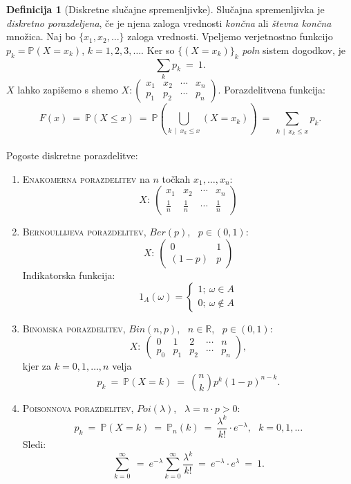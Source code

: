 \documentclass[11pt]{article}
\theoremstyle{definition}
\newtheorem{definicija}{Definicija}[section]
\theoremstyle{definition}
\theoremstyle{definition}
\begin{document}
\begin{definicija}[Diskretne slučajne spremenljivke]

Slučajna spremenljivka je \textit{diskretno porazdeljena}, če je njena zaloga vrednosti \textit{končna} ali \textit{števna končna} množica. Naj bo $\{ x_1, x_2, \ldots \}$ zaloga vrednosti. Vpeljemo verjetnostno funkcijo $p_k = \mathbb{P}(X = x_k)$, $k = 1, 2, 3, \ldots.$ Ker so $\{ (X = x_k) \}_k$ \textit{poln} sistem dogodkov, je 
$$\sum_k p_k ~=~ 1.$$
$X$ lahko zapišemo s shemo 
$X: \begin{pmatrix}
	x_1 & x_2 & \cdots & x_n \\
	p_1 & p_2 & \cdots & p_n
\end{pmatrix}$. Porazdelitvena funkcija:
$$F(x) ~=~ \mathbb{P}(X \leq x) ~=~ \mathbb{P}\left( \bigcup_{k ~\mid~ x_k \leq x} (X = x_k) \right) ~=~ \sum_{k ~\mid~ x_k \leq x} p_k.$$ \\

\noindent Pogoste diskretne porazdelitve:
\begin{enumerate}
	\item \textsc{Enakomerna porazdelitev} na $n$ točkah $x_1, \ldots, x_n$:
	$$X: ~\begin{pmatrix}
		x_1 & x_2 & \cdots & x_n \\
		\frac{1}{n} & \frac{1}{n} & \cdots & \frac{1}{n}
	\end{pmatrix}$$
	
	\item \textsc{Bernoullijeva porazdelitev}, $Ber(p)$, ~$p \in (0, 1)$:
	$$X: ~\begin{pmatrix}
		0 & 1 \\
		(1-p) & p
	\end{pmatrix}$$
	Indikatorska funkcija:
	$$1_A(\omega) = \begin{cases}
	1 ; ~\omega \in A \\
	0 ; ~\omega \notin A
	\end{cases}$$
	
	\item \textsc{Binomska porazdelitev}, $Bin(n, p)$, ~$n \in \mathbb{R}$, ~$p \in (0, 1)$:
	$$X: ~\begin{pmatrix}
		0 & 1 & 2 & \cdots & n \\
		p_0 & p_1 & p_2 & \cdots & p_n
	\end{pmatrix},$$
	kjer za $k = 0, 1, \ldots, n$ velja
	$$p_k ~=~ \mathbb{P}(X = k) ~=~ \binom{n}{k} p^k (1 - p)^{n-k}.$$
	
	\item \textsc{Poisonnova porazdelitev}, $Poi(\lambda)$, ~$\lambda = n \cdot p > 0$:
	$$p_k ~=~ \mathbb{P}(X = k) ~=~ \mathbb{P}_n(k) ~=~ \frac{\lambda^k}{k!} \cdot e^{-\lambda}, ~~~k = 0, 1, \ldots$$
	Sledi:
	$$\sum_{k=0}^{\infty} ~=~ e^{-\lambda} \sum_{k=0}^{\infty} \frac{\lambda^k}{k!} ~=~ e^{-\lambda} \cdot e^{\lambda} ~=~ 1.$$
	

\end{enumerate}
\end{definicija}
\end{document}
